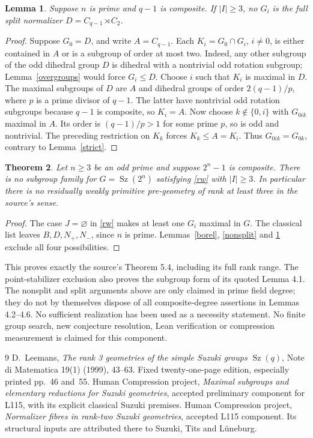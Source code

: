 \documentclass[11pt,a4paper]{article}
\newtheorem{lemma}{Lemma}
\newtheorem{theorem}[lemma]{Theorem}
\newcommand{\Sz}{\operatorname{Sz}}
\begin{document}
\begin{lemma}\label{split}
Suppose $n$ is prime and $q-1$ is composite. If $|I|\ge3$, no $G_i$
is the full split normalizer $D=C_{q-1}\rtimes C_2$.
\end{lemma}
\begin{proof}
Suppose $G_0=D$, and write $A=C_{q-1}$. Each $K_i=G_0\cap G_i$,
$i\ne0$, is either contained in $A$ or is a subgroup of order at most
two. Indeed, any other subgroup of the odd dihedral group $D$ is
dihedral with a nontrivial odd rotation subgroup; Lemma~\ref{overgroups}
would force $G_i\le D$.
Choose $i$ such that $K_i$ is maximal in $D$. The maximal subgroups
of $D$ are $A$ and dihedral groups of order $2(q-1)/p$, where $p$
is a prime divisor of $q-1$. The latter have nontrivial odd rotation
subgroups because $q-1$ is composite, so $K_i=A$.
Now choose $k\notin\{0,i\}$ with $G_{0ik}$ maximal in $A$.
Its order is $(q-1)/p>1$ for some prime $p$, so is odd and nontrivial.
The preceding restriction on $K_k$ forces $K_k\le A=K_i$. Thus
$G_{0ik}=G_{0k}$, contrary to Lemma~\ref{strict}.
\end{proof}

\begin{theorem}\label{main}
Let $n\ge3$ be an odd prime and suppose $2^n-1$ is composite.
There is no subgroup family for $G=\Sz(2^n)$ satisfying \eqref{rw}
with $|I|\ge3$. In particular there is no residually weakly primitive
pre-geometry of rank at least three in the source's sense.
\end{theorem}
\begin{proof}
The case $J=\varnothing$ in \eqref{rw} makes at least one $G_i$
maximal in $G$. The classical list leaves $B,D,N_+,N_-$, since
$n$ is prime. Lemmas~\ref{borel}, \ref{nonsplit} and \ref{split}
exclude all four possibilities.
\end{proof}

This proves exactly the source's Theorem 5.4, including its full rank
range. The point-stabilizer exclusion also proves the subgroup form of
its quoted Lemma 4.1. The nonsplit and split arguments above are only
claimed in prime field degree; they do not by themselves dispose of
all composite-degree assertions in Lemmas 4.2--4.6. No sufficient
realization has been used as a necessity statement. No finite group
search, new conjecture resolution, Lean verification or compression
measurement is claimed for this component.

\begin{thebibliography}{9}
D.~Leemans, \emph{The rank 3 geometries of the simple
Suzuki groups $\Sz(q)$}, Note di Matematica 19(1) (1999), 43--63.
Fixed twenty-one-page edition, especially printed pp.~46 and~55.
Human Compression project, \emph{Maximal subgroups
and elementary reductions for Suzuki geometries}, accepted preliminary
component for L115, with its explicit classical Suzuki premises.
Human Compression project, \emph{Normalizer fibres
in rank-two Suzuki geometries}, accepted L115 component. Its structural
inputs are attributed there to Suzuki, Tits and L\"uneburg.
\end{thebibliography}
\end{document}
